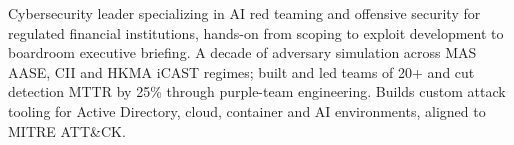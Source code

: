 

\begin{cvparagraph}


Cybersecurity leader specializing in AI red teaming and offensive security for regulated financial institutions, hands-on from scoping to exploit development to boardroom executive briefing. 
A decade of adversary simulation across MAS AASE, CII and HKMA iCAST regimes; built and led teams of 20+ and cut detection MTTR by 25\% through purple-team engineering. Builds custom attack tooling for Active Directory, cloud, container and AI environments, aligned to MITRE ATT\&CK.
\end{cvparagraph}
